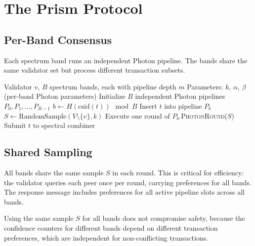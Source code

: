 \section{The Prism Protocol}

\label{sec:prism-protocol}

\subsection{Per-Band Consensus}

Each spectrum band runs an independent Photon pipeline. The bands share the same
validator set but process different transaction subsets.

\begin{algorithm}[H]
\caption{Prism Protocol --- Multi-Spectrum Parallel Consensus}
\label{alg:prism-prism-core}
\begin{algorithmic}[1]
\Require Validator $v$, $B$ spectrum bands, each with pipeline depth $m$
\Require Parameters: $k$, $\alpha$, $\beta$ (per-band Photon parameters)
\State Initialize $B$ independent Photon pipelines $P_0, P_1, \ldots, P_{B-1}$
\Loop
    \State {}
        \State $b \gets H(\text{csid}(t)) \mod B$
        \State Insert $t$ into pipeline $P_b$
    \EndFor
    \State {}
    \State $S \gets \text{RandomSample}(V \setminus \{v\}, k)$
        \State Execute one round of $P_b$.\textsc{PhotonRound}($S$)
    \EndFor
    \State {}
            \State Submit $t$ to spectral combiner
        \EndFor
    \EndFor
\EndLoop
\end{algorithmic}
\end{algorithm}

\subsection{Shared Sampling}

All bands share the same sample $S$ in each round. This is critical for efficiency:
the validator queries each peer once per round, carrying preferences for all bands.
The response message includes preferences for all active pipeline slots across all bands.

\begin{lemma}
\label{lem:prism-shared-sample}
Using the same sample $S$ for all bands does not compromise safety, because the
confidence counters for different bands depend on different transaction preferences,
which are independent for non-conflicting transactions.
\end{lemma}

